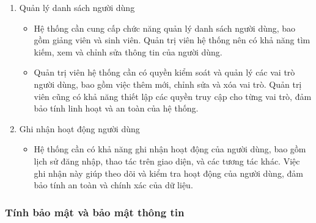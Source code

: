 \documentclass[../Thesis.tex]{subfiles}
\begin{document}
\begin{enumerate}
                \item Quản lý danh sách người dùng
                    \begin{itemize}[label=$\bullet$]
                        \item Hệ thống cần cung cấp chức năng quản lý danh sách người dùng, bao gồm giảng viên và sinh viên. Quản trị viên hệ thống nên có khả năng tìm kiếm, xem và chỉnh sửa thông tin của người dùng.

                        \item Quản trị viên hệ thống cần có quyền kiểm soát và quản lý các vai trò người dùng, bao gồm việc thêm mới, chỉnh sửa và xóa vai trò. Quản trị viên cũng có khả năng thiết lập các quyền truy cập cho từng vai trò, đảm bảo tính linh hoạt và an toàn của hệ thống.
                    \end{itemize}

                \item Ghi nhận hoạt động người dùng
                    \begin{itemize}[label=$\bullet$]
                        \item Hệ thống cần có khả năng ghi nhận hoạt động của người dùng, bao gồm lịch sử đăng nhập, thao tác trên giao diện, và các tương tác khác. Việc ghi nhận này giúp theo dõi và kiểm tra hoạt động của người dùng, đảm bảo tính an toàn và chính xác của dữ liệu.
                    \end{itemize}
            \end{enumerate}

        \subsubsection{Tính bảo mật và bảo mật thông tin}
\end{document}
